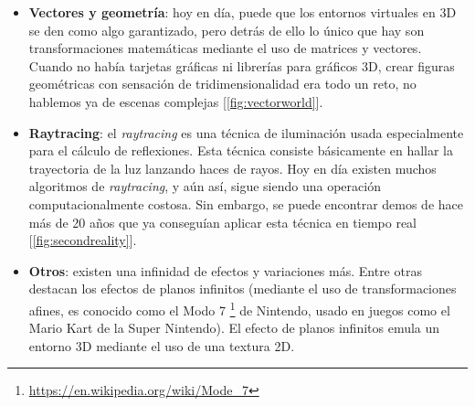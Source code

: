 \begin{itemize}
	\item \textbf{Vectores y geometría}: hoy en día, puede que los entornos virtuales en 3D se den como algo garantizado, pero detrás de ello lo único que hay son transformaciones matemáticas mediante el uso de matrices y vectores. Cuando no había tarjetas gráficas ni librerías para gráficos 3D, crear figuras geométricas con sensación de tridimensionalidad era todo un reto, no hablemos ya de escenas complejas [\ref{fig:vectorworld}].
	\item \textbf{Raytracing}: el \emph{raytracing} es una técnica de iluminación usada especialmente para el cálculo de reflexiones. Esta técnica consiste básicamente en hallar la trayectoria de la luz lanzando haces de rayos. Hoy en día existen muchos algoritmos de \emph{raytracing}, y aún así, sigue siendo una operación computacionalmente costosa. Sin embargo, se puede encontrar demos de hace más de 20 años que ya conseguían aplicar esta técnica en tiempo real [\ref{fig:secondreality}].
	\item \textbf{Otros}: existen una infinidad de efectos y variaciones más. Entre otras destacan los efectos de planos infinitos (mediante el uso de transformaciones afines, es conocido como el Modo 7 \footnote{\url{https://en.wikipedia.org/wiki/Mode_7}} de Nintendo, usado en juegos como el Mario Kart de la Super Nintendo). El efecto de planos infinitos emula un entorno 3D mediante el uso de una textura 2D.
\end{itemize}

